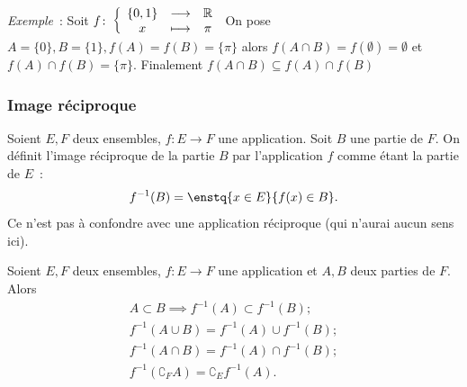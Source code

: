 %
\emph{Exemple}~: Soit $f\colon \left\{\begin{array}{ccc} \{0,1\} & \longrightarrow &\mathbb{R}\\ x & \longmapsto & \pi \end{array} \right.$ On pose $A=\{0\}, B=\{1\}, f(A)=f(B)=\{\pi\}$ alors $f(A \cap B)=f(\emptyset)=\emptyset$ et $f(A) \cap f(B)=\{\pi\}$. Finalement $f(A \cap B) \subseteq f(A) \cap f(B)$

\subsubsection{Image réciproque} 
\label{chap3-subsubsec:imagereciproque}
\begin{defdef}
  Soient $E,F$ deux ensembles, $f:E \longrightarrow F$ une application. Soit $B$ une partie de $F$. On définit l'image réciproque de la partie $B$ par l'application $f$ comme étant la partie de $E$~:
  \begin{equation}
    f^{-1}(B)=\enstq{x \in E}{f(x) \in B}.
  \end{equation}
  Ce n'est pas à confondre avec une application réciproque (qui n'aurai aucun sens ici).
\end{defdef}
%
\begin{prop}
  Soient $E,F$ deux ensembles, $f:E \longrightarrow F$ une application et $A,B$ deux parties de $F$. Alors
  \begin{gather}
    A \subset B \implies f^{-1}(A) \subset f^{-1}(B);\\
    f^{-1}(A \cup B) = f^{-1}(A) \cup f^{-1}(B);\\
    f^{-1}(A \cap B) = f^{-1}(A) \cap f^{-1}(B);\\
    f^{-1}(\complement_F A) = \complement_E f^{-1}(A).
  \end{gather}
\end{prop}
